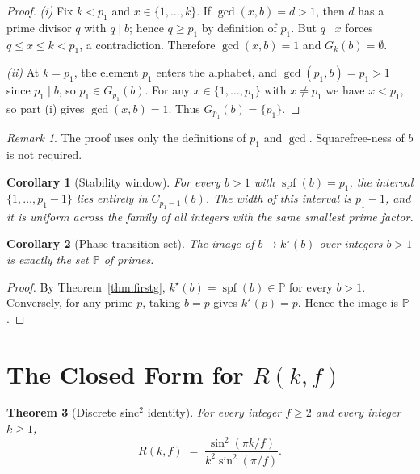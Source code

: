 \documentclass[11pt,reqno]{amsart}
\theoremstyle{plain}
\newtheorem{theorem}{Theorem}
\newtheorem{corollary}[theorem]{Corollary}
\theoremstyle{definition}
\theoremstyle{remark}
\newtheorem*{remark}{Remark}
\DeclareMathOperator{\spf}{spf}
\newcommand{\Prm}{\mathbb{P}}
\begin{document}
\begin{proof}
\textit{(i)} Fix $k < p_{1}$ and $x \in \{1,\dots,k\}$. If
$\gcd(x,b) = d > 1$, then $d$ has a prime divisor $q$ with $q\mid b$;
hence $q \ge p_{1}$ by definition of $p_{1}$. But $q \mid x$ forces
$q \le x \le k < p_{1}$, a contradiction. Therefore $\gcd(x,b) = 1$
and $G_{k}(b) = \emptyset$.

\textit{(ii)} At $k = p_{1}$, the element $p_{1}$ enters the alphabet,
and $\gcd(p_{1},b) = p_{1} > 1$ since $p_{1}\mid b$, so
$p_{1}\in G_{p_{1}}(b)$. For any $x \in \{1,\dots,p_{1}\}$ with
$x \ne p_{1}$ we have $x < p_{1}$, so part (i) gives $\gcd(x,b)=1$.
Thus $G_{p_{1}}(b) = \{p_{1}\}$.
\end{proof}

\begin{remark}
The proof uses only the definitions of $p_{1}$ and $\gcd$.
Squarefree-ness of $b$ is not required.
\end{remark}

\begin{corollary}[Stability window]\label{cor:stability}
For every $b > 1$ with $\spf(b) = p_{1}$, the interval
$\{1,\dots,p_{1}-1\}$ lies entirely in $C_{p_{1}-1}(b)$. The width of
this interval is $p_{1}-1$, and it is uniform across the family of
all integers with the same smallest prime factor.
\end{corollary}

\begin{corollary}[Phase-transition set]\label{cor:phase}
The image of $b\mapsto k^{\star}(b)$ over integers $b > 1$ is exactly
the set $\Prm$ of primes.
\end{corollary}

\begin{proof}
By Theorem~\ref{thm:firstg}, $k^{\star}(b) = \spf(b) \in \Prm$ for
every $b > 1$. Conversely, for any prime $p$, taking $b = p$ gives
$k^{\star}(p) = p$. Hence the image is $\Prm$.
\end{proof}

\section{The Closed Form for $R(k,f)$}\label{sec:harmonic}

\begin{theorem}[Discrete sinc${}^{2}$ identity]\label{thm:closedform}
For every integer $f \ge 2$ and every integer $k \ge 1$,
\begin{equation}\label{eq:closedform}
  R(k,f) \;=\; \frac{\sin^{2}(\pi k/f)}{k^{2}\sin^{2}(\pi/f)}.
\end{equation}
\end{theorem}
\end{document}
